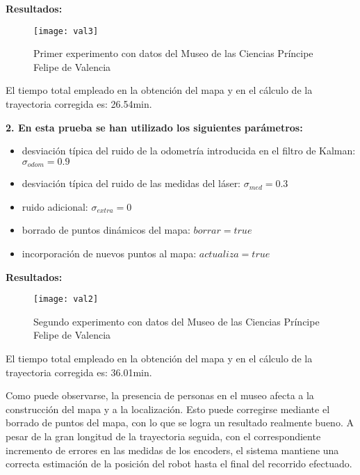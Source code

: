 \textbf{Resultados:}
\begin{figure}[h]
  \centering\texttt{[image: val3]}\\
  \caption{Primer experimento con datos del Museo de las Ciencias Príncipe Felipe de Valencia}\label{fg:val3}
\end{figure}

El tiempo total empleado en la obtención del mapa y en el cálculo de la trayectoria corregida es: 26.54min.


\noindent
\textbf{\textbf{2.} En esta prueba se han utilizado los siguientes parámetros:}
\begin{itemize}
  \item desviación típica del ruido de la odometría introducida en el filtro de Kalman: $\sigma_{odom} = 0.9$
  \item desviación típica del ruido de las medidas del láser: $\sigma_{med} = 0.3$
  \item ruido adicional: $\sigma_{extra} = 0$
  \item borrado de puntos dinámicos del mapa: $borrar = true$
  \item incorporación de nuevos puntos al mapa: $actualiza = true$
\end{itemize}


\textbf{Resultados:}
\begin{figure}[h]
  \centering\texttt{[image: val2]}\\
  \caption{Segundo experimento con datos del Museo de las Ciencias Príncipe Felipe de Valencia}\label{fg:val2}
\end{figure}

El tiempo total empleado en la obtención del mapa y en el cálculo de la trayectoria corregida es: 36.01min.

\vspace{0.2cm}
\noindent
Como puede observarse, la presencia de personas en el museo afecta a la construcción del mapa y a la localización. Esto puede corregirse mediante el borrado de puntos del mapa, con lo que se logra un resultado realmente bueno. A pesar de la gran longitud de la trayectoria seguida, con el correspondiente incremento de errores en las medidas de los encoders, el sistema mantiene una correcta estimación de la posición del robot hasta el final del recorrido efectuado.




